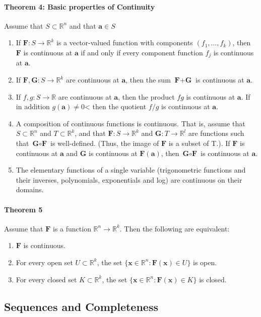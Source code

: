 \documentclass[11pt]{article}
\newcommand{\tb}[1]{\textbf{#1}}
\newcommand{\real}[0]{\mathbb{R}}
\newcommand{\vx}[0]{\tb{x}}
\newcommand{\va}[0]{\tb{a}}
\newcommand{\vf}[0]{\tb{F}}
\newcommand{\vg}[0]{\tb{G}}
\begin{document}
\paragraph{Theorem 4: Basic properties of Continuity} Assume that $S \subset \real^n$ and that $\va \in S$
\begin{enumerate}
	\item If $\vf: S \rightarrow \real^k$ is a vector-valued function with components $(f_1, \hdots, f_k)$, then $\vf$ is continuous at $\va$ if and only if every component function $f_j$ is continuous at $\va$.
	\item If $\vf, \vg: S \rightarrow \real^k$ are continuous at $\va$, then the sum $\vf + \vg$ is continuous at $\va$.
	\item If $f, g: S \rightarrow \real$ are continuous at $\va$, then the product $fg$ is continuous at $\va$. If in addition $g(\va) \neq 0$< then the quotient $f/g$ is continuous at $\va$.
	\item A composition of continuous functions is continuous. That is, assume that $S \subset \real^n$ and $T \subset \real^k$, and that $\vf: S \rightarrow \real^k$ and $\vg: T \rightarrow \real^l$ are functions such that $\vg \circ \vf $ is well-defined. (Thus, the image of $\vf$ is a subset of T.). If $\vf$ is continuous at $\va$ and $\vg$ is continuous at $\vf(\va)$, then $\vg \circ \vf$ is continuous at $\va$.
	\item The elementary functions of a single variable (trigonometric functions and their inverses, polynomials, exponentials and log) are continuous on their domains.
\end{enumerate}
\paragraph{Theorem 5} Assume that $\vf$ is a function $\real^n \rightarrow \real^k$. Then the following are equivalent:
\begin{enumerate}
	\item $\vf$ is continuous.
	\item For every open set $U \subset \real^k$, the set $\{ \vx \in \real^n: \vf(\vx) \in U\}$ is open.
	\item For every closed set $K \subset \real^k$, the set $\{ \vx \in \real^n: \vf(\vx) \in K \}$ is closed.
\end{enumerate}
\subsection{Sequences and Completeness}
\end{document}
